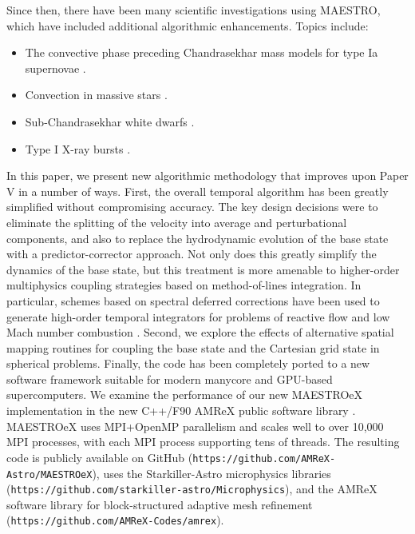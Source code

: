 Since then, there have been many scientific investigations using MAESTRO, which have included additional algorithmic enhancements.  Topics include:
\begin{itemize}
\item The convective phase preceding Chandrasekhar mass models for type Ia supernovae \citep{MAESTRO_convection,MAESTRO_AMR,MAESTRO_CASTRO}.
\item Convection in massive stars \citep{Gilet:2013}.
\item Sub-Chandrasekhar white dwarfs \citep{subChandra_I,subChandra_II}.
\item Type I X-ray bursts \citep{XRB_I,XRB_II,XRB_III}.
\end{itemize}

In this paper, we present new algorithmic methodology that improves upon Paper V in a number of ways.
First, the overall temporal algorithm has been greatly simplified without compromising accuracy.
The key design decisions were to eliminate the splitting of the velocity into average and perturbational components, 
and also to replace the hydrodynamic evolution of the base state with a predictor-corrector approach.
Not only does this greatly simplify the dynamics of the base
state, but this treatment is more amenable to higher-order multiphysics coupling strategies
based on method-of-lines integration.  
In particular, schemes based on spectral deferred corrections have been used to generate high-order temporal integrators for problems of reactive flow \citep{dutt2000spectral} and low Mach number combustion \citep{pazner2016high,nonaka2018conservative}.
Second, we explore the effects of alternative spatial mapping routines for coupling the base state and the Cartesian grid state in spherical problems.
Finally, the code has been completely ported to a new software framework suitable for modern manycore and GPU-based supercomputers.
We examine the performance of our new MAESTROeX implementation in the new C++/F90 AMReX public software library \cite{AMReX,AMReX_JOSS}.
MAESTROeX uses MPI+OpenMP parallelism and scales well to over 10,000 MPI processes, with each MPI process supporting tens of threads.
The resulting code is publicly available on GitHub ({\tt https://github.com/AMReX-Astro/MAESTROeX}),
uses the Starkiller-Astro microphysics libraries ({\tt https://github.com/starkiller-astro/Microphysics}),
and the AMReX software library for block-structured adaptive mesh refinement ({\tt https://github.com/AMReX-Codes/amrex}).

